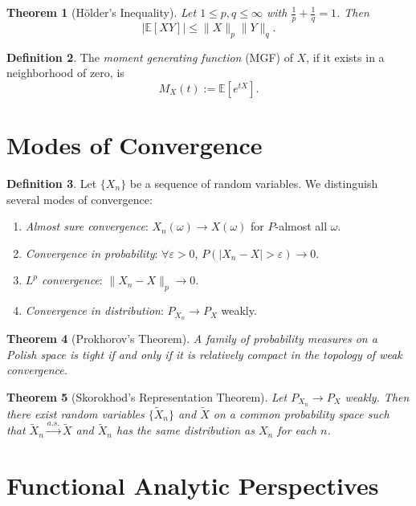 \documentclass[11pt,reqno]{amsart}
\newtheorem{theorem}{Theorem}[section]
\theoremstyle{definition}
\newtheorem{definition}[theorem]{Definition}
\theoremstyle{remark}
\begin{document}
\begin{theorem}[Hölder's Inequality]
	Let $1 \leq p, q \leq \infty$ with $\frac{1}{p} + \frac{1}{q} = 1$. Then
	\[
		|\mathbb{E}[XY]| \leq \|X\|_p \|Y\|_q.
	\]
\end{theorem}

\begin{definition}
	The \emph{moment generating function} (MGF) of $X$, if it exists in a neighborhood of zero, is
	\[
		M_X(t) := \mathbb{E}[e^{tX}].
	\]
\end{definition}

\section{Modes of Convergence}

\begin{definition}
	Let $\{X_n\}$ be a sequence of random variables. We distinguish several modes of convergence:
	\begin{enumerate}[label=(\roman*)]
		\item \emph{Almost sure convergence}: $X_n(\omega) \to X(\omega)$ for $P$-almost all $\omega$.
		\item \emph{Convergence in probability}: $\forall \varepsilon>0$, $P(|X_n - X| > \varepsilon) \to 0$.
		\item \emph{$L^p$ convergence}: $\|X_n - X\|_p \to 0$.
		\item \emph{Convergence in distribution}: $P_{X_n} \to P_X$ weakly.
	\end{enumerate}
\end{definition}

\begin{theorem}[Prokhorov's Theorem]
	A family of probability measures on a Polish space is tight if and only if it is relatively compact in the topology of weak convergence.
\end{theorem}

\begin{theorem}[Skorokhod's Representation Theorem]
	Let $P_{X_n} \to P_X$ weakly. Then there exist random variables $\{\tilde{X}_n\}$ and $\tilde{X}$ on a common probability space such that $\tilde{X}_n \xrightarrow{a.s.} \tilde{X}$ and $\tilde{X}_n$ has the same distribution as $X_n$ for each $n$.
\end{theorem}

\section{Functional Analytic Perspectives}
\end{document}

